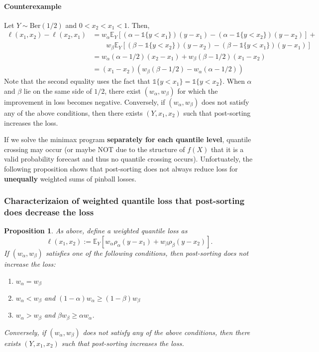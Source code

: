 \documentclass{article}
\newtheorem{prop}{Proposition}
\newcommand{\indi}[1]{\mathds{1}\{#1\}}
\newcommand{\E}{\mathbb{E}}
\begin{document}
\paragraph{Counterexample} Let $Y \sim \text{Ber}(1/2)$ and $0 < x_2 < x_1 < 1$. Then, 
\begin{align*}
\ell(x_1, x_2) - \ell(x_2, x_1) 
& = w_\alpha \E_Y \left[(\alpha - \indi{y < x_1})(y-x_1) - (\alpha - \indi{y < x_2})(y-x_2)\right] + \\ 
& \qquad w_\beta \E_Y \left[(\beta - \indi{y < x_2})(y-x_2) - (\beta - \indi{y < x_1})(y-x_1) \right] \\
& = w_\alpha (\alpha - 1/2)(x_2 - x_1) + w_\beta (\beta - 1/2)(x_1 - x_2) \\
& = (x_1 - x_2)(w_\beta (\beta - 1/2) - w_\alpha (\alpha - 1/2))
\end{align*}
Note that the second equality uses the fact that $\indi{y < x_1} = \indi{y < x_2}$. When $\alpha$ and $\beta$ lie on the same side of $1/2$, there exist $(w_\alpha, w_\beta)$ for which the improvement in loss becomes negative.
Conversely, if $(w_\alpha, w_\beta)$ does not satisfy any of the above conditions, then there exists $(Y, x_1, x_2)$ such that post-sorting increases the loss.

\smallskip
If we solve the minimax program \textbf{separately for each quantile level}, quantile crossing may occur (or maybe NOT due to the structure of $f(X)$ that it is a valid probability forecast and thus no quantile crossing occurs). Unfortuately, the following proposition shows that post-sorting does not always reduce loss for \textbf{unequally} weighted sums of pinball losses.

\subsubsection{Characterizaion of weighted quantile loss that post-sorting does decrease the loss}
\begin{prop}
As above, define a weighted quantile loss as
\[
\ell(x_1, x_2) := \E_Y [w_\alpha \rho_\alpha (y-x_1) + w_\beta \rho_\beta (y-x_2)].
\]
If $(w_\alpha, w_\beta)$ satisfies one of the following conditions, then post-sorting does not increase the loss:
\begin{enumerate}
  \item $w_\alpha = w_\beta$
  \item $w_\alpha < w_\beta$ and $(1-\alpha)w_\alpha \geq (1-\beta)w_\beta$
  \item $w_\alpha > w_\beta$ and $\beta w_\beta \geq \alpha w_\alpha$.
\end{enumerate}
Conversely, if $(w_\alpha, w_\beta)$ does not satisfy any of the above conditions, then there exists $(Y, x_1, x_2)$ such that post-sorting increases the loss.
\end{prop}
\end{document}
